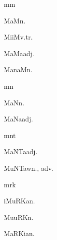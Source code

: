 \begin{multicols*}{2}
\begin{dictroot}{m}{m}
    \begin{dictentry}{MaM}{n.}
    \end{dictentry}
    \begin{dictentry}{MiiM}{v.tr.}
    \end{dictentry}
    \begin{dictentry}{MaMa}{adj.}
    \end{dictentry}
    \begin{dictentry}{ManaM}{n.}
    \end{dictentry}
\end{dictroot}

\begin{dictroot}{m}{n}
    \begin{dictentry}{MaN}{n.}
    \end{dictentry}
    \begin{dictentry}{MaNa}{adj.}
    \end{dictentry}
\end{dictroot}

\begin{dictroot}{m}{nt}
    \begin{dictentry}{MaNTa}{adj.}
    \end{dictentry}
    \begin{dictentry}{MuNTaw}{n., adv.}
    \end{dictentry}
\end{dictroot}

\begin{dictroot}{m}{rk}
    \begin{dictentry}{iMuRKa}{n.}
    \end{dictentry}
    \begin{dictentry}{MuuRK}{n.}
    \end{dictentry}
    \begin{dictentry}{MaRKia}{n.}
    \end{dictentry}
\end{dictroot}


\end{multicols*}
